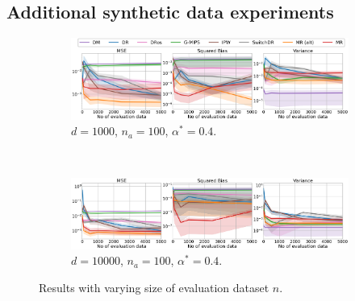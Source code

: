 \subsection{Additional synthetic data experiments} \label{sec:app-additional-results}
\begin{figure}[ht]
     \centering
     \begin{subfigure}[b]{0.8\textwidth}
         \centering
         \includegraphics[width=\textwidth]{figures/mr/all_baselines/ope_vs_neval_nac_100_alphatar_0.4_dimc_1000_ntrain_100000.png}
         \caption{$d=1000$, $n_{a}=100$, $\alpha^\ast = 0.4$.}
         \label{fig:mse-vs-neval-conf2a}
     \end{subfigure}\\
     \begin{subfigure}[b]{0.8\textwidth}
         \centering
         \includegraphics[width=\textwidth]{figures/mr/all_baselines/ope_vs_neval_dimc_10000_alphatar_0.4_nac_100_ntrain_100000.png}
         \caption{$d=10000$, $n_{a}=100$, $\alpha^\ast = 0.4$.}
         \label{fig:mse-vs-neval-conf2b}
     \end{subfigure}
     \caption{Results with varying size of evaluation dataset $n$.}
     \label{fig:mse-vs-neval-conf2}
 \end{figure}

